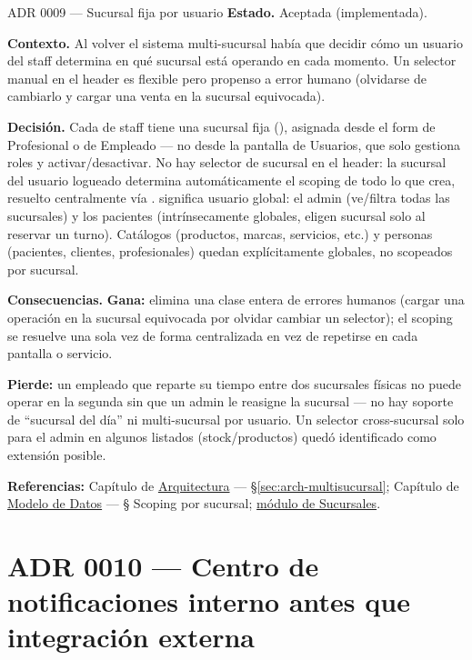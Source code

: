 \begin{cajaADR}{ADR 0009 --- Sucursal fija por usuario}
\textbf{Estado.} Aceptada (implementada).

\textbf{Contexto.} Al volver el sistema multi-sucursal había que decidir cómo un usuario del staff determina en qué sucursal está operando en cada momento. Un selector manual en el header es flexible pero propenso a error humano (olvidarse de cambiarlo y cargar una venta en la sucursal equivocada).

\textbf{Decisión.} Cada  de staff tiene una sucursal fija (), asignada desde el form de Profesional o de Empleado --- no desde la pantalla de Usuarios, que solo gestiona roles y activar/desactivar. No hay selector de sucursal en el header: la sucursal del usuario logueado determina automáticamente el scoping de todo lo que crea, resuelto centralmente vía \allowbreak {}\allowbreak {}.  significa usuario global: el admin (ve/filtra todas las sucursales) y los pacientes (intrínsecamente globales, eligen sucursal solo al reservar un turno). Catálogos (productos, marcas, servicios, etc.) y personas (pacientes, clientes, profesionales) quedan explícitamente globales, no scopeados por sucursal.

\textbf{Consecuencias.} \textbf{Gana:} elimina una clase entera de errores humanos (cargar una operación en la sucursal equivocada por olvidar cambiar un selector); el scoping se resuelve una sola vez de forma centralizada en vez de repetirse en cada pantalla o servicio.

\textbf{Pierde:} un empleado que reparte su tiempo entre dos sucursales físicas no puede operar en la segunda sin que un admin le reasigne la sucursal --- no hay soporte de ``sucursal del día'' ni multi-sucursal por usuario. Un selector cross-sucursal solo para el admin en algunos listados (stock/productos) quedó identificado como extensión posible.
\end{cajaADR}

\textbf{Referencias:} Capítulo de \hyperref[sec:arch-multisucursal]{Arquitectura} --- \S\ref{sec:arch-multisucursal}; Capítulo de \hyperref[sec:modelo-datos]{Modelo de Datos} --- § Scoping por sucursal; \hyperref[mod:15-sucursales]{módulo de Sucursales}.

\section{ADR 0010 --- Centro de notificaciones interno antes que integración externa}
\label{adr:0010}

